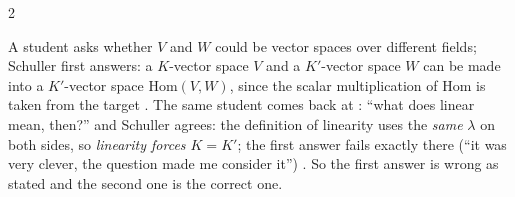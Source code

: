 \begin{paracol}{2}
\begin{coursenote}
A student asks whether $V$ and $W$ could be vector spaces over different fields; Schuller first answers: a $K$-vector space $V$ and a $K'$-vector space $W$ can be made into a $K'$-vector space $\mathrm{Hom}(V,W)$, since the scalar multiplication of $\mathrm{Hom}$ is taken
from the target . The same student comes back at : ``what does linear mean, then?'' and Schuller agrees: the definition of linearity uses the \emph{same} $\lambda$ on both sides, so
\emph{linearity forces $K=K'$}; the first answer fails exactly there (``it was very clever, the question made me consider it'') . So the first answer is wrong as stated and the second one is the correct one.
\end{coursenote}


\end{paracol}
